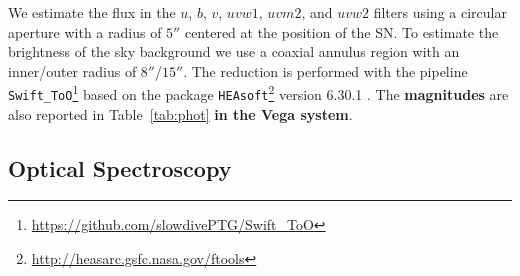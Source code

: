 \documentclass[twocolumn]{aastex631}
\newcommand{\rev}[1]{\textbf{#1}}
\begin{document}
\begin{CJK*}{UTF8}{gbsn}
We estimate the flux in the $u$, $b$, $v$, $uvw1$, $uvm2$, and $uvw2$ filters using a circular aperture with a radius of $5''$ centered at the position of the SN. To estimate the brightness of the sky background we use a coaxial annulus region with an inner/outer radius of $8''$/$15''$. The reduction is performed with the pipeline \texttt{Swift\_ToO}\footnote{\url{https://github.com/slowdivePTG/Swift\_ToO}} based on the package \texttt{HEAsoft}\footnote{\url{http://heasarc.gsfc.nasa.gov/ftools}} version 6.30.1 \citep{HEAsoft_2014}. The \rev{magnitudes} are also reported in Table~\ref{tab:phot} \rev{in the Vega system}.



\subsection{Optical Spectroscopy}\label{sec:optical_spec}


\end{CJK*}
\end{document}
